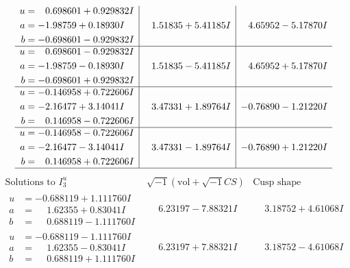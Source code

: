 \documentclass[1p]{elsarticle_modified}
\theoremstyle{definition}
\newcommand{\I}{\sqrt{-1}}
\begin{document}
$$\begin{array}{c|c|c}
\begin{aligned}
u &= \phantom{-}0.698601 + 0.929832 I \\
a &= -1.98759 + 0.18930 I \\
b &= -0.698601 - 0.929832 I\end{aligned}
 & \phantom{-}1.51835 + 5.41185 I & \phantom{-}4.65952 - 5.17870 I \\ \hline\begin{aligned}
u &= \phantom{-}0.698601 - 0.929832 I \\
a &= -1.98759 - 0.18930 I \\
b &= -0.698601 + 0.929832 I\end{aligned}
 & \phantom{-}1.51835 - 5.41185 I & \phantom{-}4.65952 + 5.17870 I \\ \hline\begin{aligned}
u &= -0.146958 + 0.722606 I \\
a &= -2.16477 + 3.14041 I \\
b &= \phantom{-}0.146958 - 0.722606 I\end{aligned}
 & \phantom{-}3.47331 + 1.89764 I & -0.76890 - 1.21220 I \\ \hline\begin{aligned}
u &= -0.146958 - 0.722606 I \\
a &= -2.16477 - 3.14041 I \\
b &= \phantom{-}0.146958 + 0.722606 I\end{aligned}
 & \phantom{-}3.47331 - 1.89764 I & -0.76890 + 1.21220 I\\
 \hline 
 \end{array}$$\newpage$$\begin{array}{c|c|c}  
\text{Solutions to }I^u_{3}& \I (\text{vol} + \sqrt{-1}CS) & \text{Cusp shape}\\
 \hline 
\begin{aligned}
u &= -0.688119 + 1.111760 I \\
a &= \phantom{-}1.62355 + 0.83041 I \\
b &= \phantom{-}0.688119 - 1.111760 I\end{aligned}
 & \phantom{-}6.23197 - 7.88321 I & \phantom{-}3.18752 + 4.61068 I \\ \hline\begin{aligned}
u &= -0.688119 - 1.111760 I \\
a &= \phantom{-}1.62355 - 0.83041 I \\
b &= \phantom{-}0.688119 + 1.111760 I\end{aligned}
 & \phantom{-}6.23197 + 7.88321 I & \phantom{-}3.18752 - 4.61068 I \\ \hline\begin{aligned}

\end{aligned}
\end{array}$$
\end{document}
